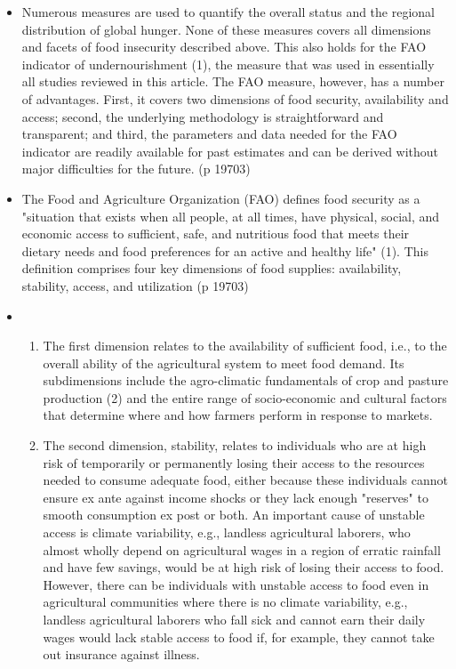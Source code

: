 \documentclass[twoside]{article}	%
\begin{document}
\begin{itemize}
\item Numerous measures are used to quantify the overall status and the regional distribution of global hunger. None of these measures covers all dimensions and facets of food insecurity described above. This also holds for the FAO indicator of undernourishment (1), the measure that was used in essentially all studies reviewed in this article. The FAO measure, however, has a number of advantages. First, it covers two dimensions of food security, availability and access; second, the underlying methodology is straightforward and transparent; and third, the parameters and data needed for the FAO indicator are readily available for past estimates and can be derived without major difficulties for the future. (p 19703)
  \item The Food and Agriculture Organization (FAO) defines food security as a "situation that exists when all people, at all times, have physical, social, and economic access to sufficient, safe, and nutritious food that meets their dietary needs and food preferences for an active and healthy life" (1). This definition comprises four key dimensions of food supplies: availability, stability, access, and utilization (p 19703)
  \item 
  \begin{enumerate}
    \item The first dimension relates to the availability of sufficient food, i.e., to the overall ability of the agricultural system to meet food demand. Its subdimensions include the agro-climatic fundamentals of crop and pasture production (2) and the entire range of socio-economic and cultural factors that determine where and how farmers perform in response to markets.
    \item The second dimension, stability, relates to individuals who are at high risk of temporarily or permanently losing their access to the resources needed to consume adequate food, either because these individuals cannot ensure ex ante against income shocks or they lack enough "reserves" to smooth consumption ex post or both. An important cause of unstable access is climate variability, e.g., landless agricultural laborers, who almost wholly depend on agricultural wages in a region of erratic rainfall and have few savings, would be at high risk of losing their access to food. However, there can be individuals with unstable access to food even in agricultural communities where there is no climate variability, e.g., landless agricultural laborers who fall sick and cannot earn their daily wages would lack stable access to food if, for example, they cannot take out insurance against illness.

\end{enumerate}
\end{itemize}
\end{document}
